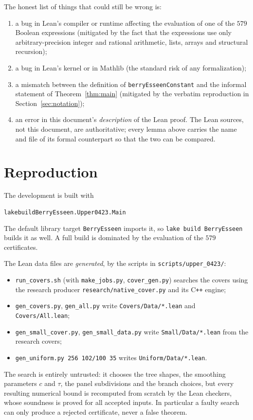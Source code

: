 \documentclass[11pt,a4paper]{article}
\newenvironment{leancode}{\par\smallskip\begin{alltt}\small}{\end{alltt}\smallskip}
\theoremstyle{definition}
\newcommand{\Lean}[1]{\texttt{#1}}
\newcommand{\file}[1]{\texttt{#1}}
\begin{document}
The honest list of things that could still be wrong is:
\begin{enumerate}[label=(\arabic*),leftmargin=2.2em]
\item a bug in Lean's compiler or runtime affecting the evaluation of one of the
  $579$ Boolean expressions (mitigated by the fact that the expressions use only
  arbitrary-precision integer and rational arithmetic, lists, arrays and
  structural recursion);
\item a bug in Lean's kernel or in Mathlib (the standard risk of any
  formalization);
\item a mismatch between the definition of \Lean{berryEsseenConstant} and the
  informal statement of Theorem~\ref{thm:main} (mitigated by the verbatim
  reproduction in Section~\ref{sec:notation});
\item an error in this document's \emph{description} of the Lean proof. The Lean
  sources, not this document, are authoritative; every lemma above carries the
  name and file of its formal counterpart so that the two can be compared.
\end{enumerate}

\section{Reproduction}
\label{sec:repro}

The development is built with
\begin{leancode}
lake build BerryEsseen.Upper0423.Main
\end{leancode}
The default library target \file{BerryEsseen} imports it, so
\texttt{lake build BerryEsseen} builds it as well. A full build is dominated by
the evaluation of the $579$ certificates.

The Lean data files are \emph{generated}, by the scripts in
\file{scripts/upper\_0423/}:
\begin{itemize}[leftmargin=1.6em]
\item \file{run\_covers.sh} (with \file{make\_jobs.py}, \file{cover\_gen.py})
  searches the covers using the research producer
  \file{research/native\_cover.py} and its C\texttt{++} engine;
\item \file{gen\_covers.py}, \file{gen\_all.py} write \file{Covers/Data/*.lean}
  and \file{Covers/All.lean};
\item \file{gen\_small\_cover.py}, \file{gen\_small\_data.py} write
  \file{Small/Data/*.lean} from the research covers;
\item \file{gen\_uniform.py 256 102/100 35} writes \file{Uniform/Data/*.lean}.
\end{itemize}
The search is entirely untrusted: it chooses the tree shapes, the smoothing
parameters $c$ and $\tau$, the panel subdivisions and the branch choices, but
every resulting numerical bound is recomputed from scratch by the Lean checkers,
whose soundness is proved for all accepted inputs. In particular a faulty search
can only produce a rejected certificate, never a false theorem.
\end{document}
